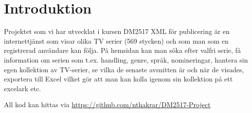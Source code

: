 \chapter{Introduktion}

Projektet som vi har utvecklat i kursen DM2517 XML för publicering är en internettjänst som visar olika TV serier (569 stycken) och som man som en registrerad användare kan följa. På hemsidan kan man söka efter valfri serie, få information om serien som t.ex. handling, genre, språk, nomineringar, hantera sin egen kollektion av TV-serier, se vilka de senaste avsnitten är och när de visades, exportera till Excel vilket gör att man kan kolla igenom sin kollektion på ett excelark etc. 

All kod kan hittas via \url{https://github.com/nthakrar/DM2517-Project}